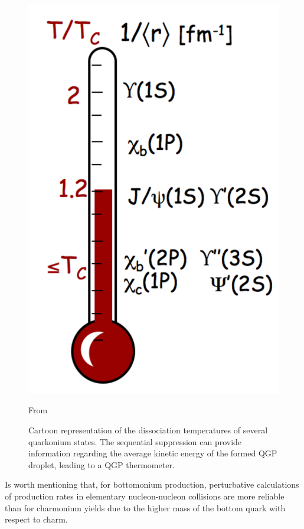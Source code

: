 

\begin{figure}[!t]
\begin{center}
\includegraphics[width=0.3\linewidth]{Chapters/Introduction/Figs/thermometer.pdf}
\caption{Cartoon representation of the dissociation temperatures of several quarkonium states. The sequential suppression can provide information regarding the average kinetic energy of the formed QGP droplet, leading to a QGP thermometer.}
From \cite{Mocsy:2008eg}
\label{fig:QGP_thermo}
\end{center}
\end{figure}

Is worth mentioning that, for bottomonium production, perturbative calculations of production rates in elementary nucleon-nucleon collisions are more reliable than for charmonium yields due to the higher mass of the bottom quark with respect to charm. 

